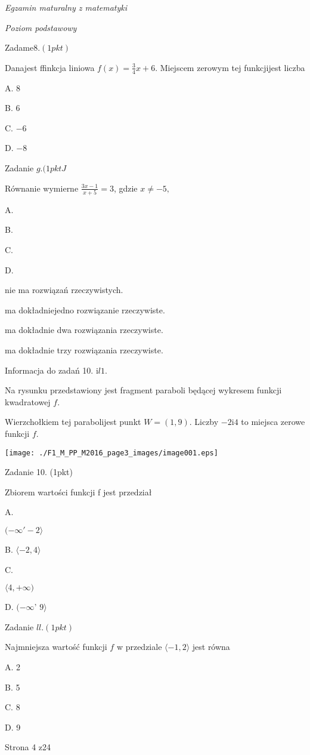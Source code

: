 \documentclass[a4paper,12pt]{article}
\begin{document}
{\it Egzamin maturalny z matematyki}

{\it Poziom podstawowy}

Zadam$\mathrm{e}8. (1pkt)$

Danajest ffinkcja liniowa $f(x)=\displaystyle \frac{3}{4}x+6$. Miejscem zerowym tej funkcjijest liczba

A. 8

B. 6

C. $-6$

D. $-8$

Zadanie $g. (1pktJ$

Równanie wymierne $\displaystyle \frac{3x-1}{x+5}=3$, gdzie $x\neq-5,$

A.

B.

C.

D.

nie ma rozwiązań rzeczywistych.

ma dokładniejedno rozwiązanie rzeczywiste.

ma dokładnie dwa rozwiązania rzeczywiste.

ma dokładnie trzy rozwiązania rzeczywiste.

Informacja do zadań 10. $\mathrm{i}l1.$

Na rysunku przedstawiony jest fragment paraboli będącej wykresem funkcji kwadratowej $f.$

Wierzchołkiem tej parabolijest punkt $W=(1,9)$. Liczby $-2\mathrm{i}4$ to miejsca zerowe funkcji $f.$
\begin{center}
\texttt{[image: ./F1\_M\_PP\_M2016\_page3\_images/image001.eps]}
\end{center}
Zadanie 10. (1pkt)

Zbiorem wartości funkcji f jest przedział

A.

$(-\infty'-2\rangle$

B. $\langle-2,  4\rangle$

C.

$\langle 4,+\infty)$

D. $(-\infty$' $ 9\rangle$

Zadanie $ll. (1pkt)$

Najmniejsza wartość funkcji $f$ w przedziale $\langle-1,2\rangle$ jest równa

A. 2

B. 5

C. 8

D. 9

Strona 4 z24
\end{document}
